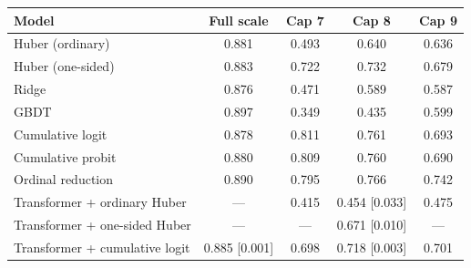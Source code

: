 \begin{tabular}{lcccc}
\toprule
Model & Full scale & Cap 7 & Cap 8 & Cap 9 \\
\midrule
Huber (ordinary) & 0.881 & 0.493 & 0.640 & 0.636 \\
Huber (one-sided) & 0.883 & 0.722 & 0.732 & 0.679 \\
Ridge & 0.876 & 0.471 & 0.589 & 0.587 \\
GBDT & 0.897 & 0.349 & 0.435 & 0.599 \\
Cumulative logit & 0.878 & 0.811 & 0.761 & 0.693 \\
Cumulative probit & 0.880 & 0.809 & 0.760 & 0.690 \\
Ordinal reduction & 0.890 & 0.795 & 0.766 & 0.742 \\
\midrule
Transformer + ordinary Huber & --- & 0.415 & 0.454 {[0.033]} & 0.475 \\
Transformer + one-sided Huber & --- & --- & 0.671 {[0.010]} & --- \\
Transformer + cumulative logit & 0.885 {[0.001]} & 0.698 & 0.718 {[0.003]} & 0.701 \\
\bottomrule
\end{tabular}
